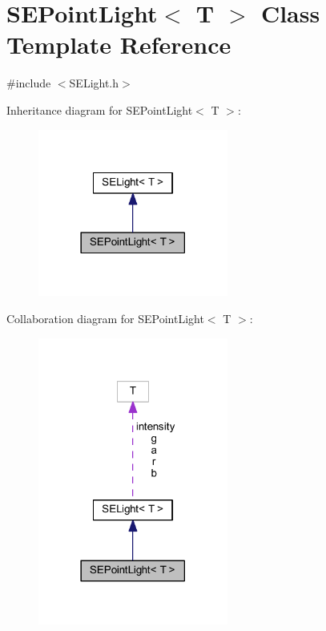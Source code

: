 \section{S\+E\+Point\+Light$<$ T $>$ Class Template Reference}
\label{class_s_e_point_light}


{\ttfamily \#include $<$S\+E\+Light.\+h$>$}



Inheritance diagram for S\+E\+Point\+Light$<$ T $>$\+:
\nopagebreak
\begin{figure}[H]
\begin{center}
\leavevmode
\includegraphics[width=177pt]{class_s_e_point_light__inherit__graph}
\end{center}
\end{figure}


Collaboration diagram for S\+E\+Point\+Light$<$ T $>$\+:
\nopagebreak
\begin{figure}[H]
\begin{center}
\leavevmode
\includegraphics[width=177pt]{class_s_e_point_light__coll__graph}
\end{center}
\end{figure}
